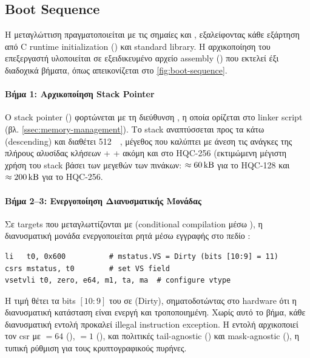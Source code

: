 \subsection{Boot Sequence}
\label{ssec:boot-sequence}

Η μεταγλώττιση πραγματοποιείται με τις σημαίες  και
, εξαλείφοντας κάθε εξάρτηση από C runtime initialization
() και standard library. Η αρχικοποίηση του επεξεργαστή
υλοποιείται σε εξειδικευμένο αρχείο assembly () που εκτελεί
έξι διαδοχικά βήματα, όπως απεικονίζεται στο \cref{fig:boot-sequence}.

\paragraph{Βήμα 1: Αρχικοποίηση Stack Pointer}

Ο stack pointer () φορτώνεται με τη διεύθυνση ,
η οποία ορίζεται στο linker script (βλ. \cref{ssec:memory-management}). Το
stack αναπτύσσεται προς τα κάτω (descending) και διαθέτει \SI{512}{\kilo\byte},
μέγεθος που καλύπτει με άνεση τις ανάγκες της πλήρους αλυσίδας κλήσεων \KeyGen +
\Encaps + \Decaps ακόμη και στο HQC-256 (εκτιμώμενη μέγιστη χρήση του stack βάσει
των μεγεθών των πινάκων: $\approx \SI{60}{\kilo\byte}$ για το HQC-128 και
$\approx \SI{200}{\kilo\byte}$ για το HQC-256.

\paragraph{Βήμα 2–3: Ενεργοποίηση Διανυσματικής Μονάδας}

Σε targets που μεταγλωττίζονται με \RVV (conditional compilation μέσω
), η διανυσματική μονάδα ενεργοποιείται ρητά μέσω
εγγραφής στο πεδίο :

\begin{lstlisting}[language={[RISC-V]Assembler}, basicstyle=\ttfamily\small]
li   t0, 0x600          # mstatus.VS = Dirty (bits [10:9] = 11)
csrs mstatus, t0        # set VS field
vsetvli t0, zero, e64, m1, ta, ma  # configure vtype
\end{lstlisting}

\noindent
Η τιμή  θέτει τα bits $[10{:}9]$ του  σε
 (Dirty), σηματοδοτώντας στο hardware ότι η διανυσματική κατάσταση
είναι ενεργή και τροποποιημένη. Χωρίς αυτό το βήμα, κάθε διανυσματική εντολή
προκαλεί illegal instruction exception. Η εντολή  αρχικοποιεί
τον  \gls{csr} με \SEW $= 64$ (), \LMUL $= 1$ (), και πολιτικές
tail-agnostic () και mask-agnostic (), η τυπική ρύθμιση για τους κρυπτογραφικούς πυρήνες.

